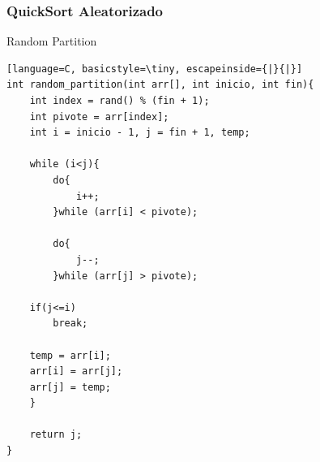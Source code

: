 \documentclass{beamer}
\begin{document}
\begin{frame}[fragile]
 \frametitle{QuickSort Aleatorizado}
\begin{exampleblock}{Random Partition}
\begin{lstlisting}[language=C, basicstyle=\tiny, escapeinside={|}{|}]
int random_partition(int arr[], int inicio, int fin){
    int index = rand() % (fin + 1);
    int pivote = arr[index];
    int i = inicio - 1, j = fin + 1, temp;
 
    while (i<j){
        do{
            i++;
        }while (arr[i] < pivote);
 
        do{
            j--;
        }while (arr[j] > pivote);

	if(j<=i)
		break;
	 
	temp = arr[i];
	arr[i] = arr[j];
	arr[j] = temp;
    }

    return j;
}
\end{lstlisting}
\end{exampleblock}
\end{frame}
\end{document}
